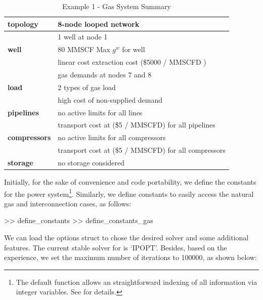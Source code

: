 \begin{table}[!ht]
\centering
\begin{threeparttable}
\caption{Example 1 - Gas System Summary}
\label{tab:ex1_gas}
\footnotesize
\begin{tabular}{ll}
\toprule
\bf{topology}	& 8-node looped network	 \\
\midrule
			& 1 well at node 1\\
\bf{well}		& 80 MMSCF Max $g^{w}$ for well\\
			& linear cost extraction cost (\$5000 / MMSCFD )\\
\midrule
			& gas demands at nodes 7 and 8\\
\bf{load}		& 2 types of gas load 	\\
			& high cost of non-supplied demand\\
\midrule
\bf{pipelines}	& no active limits for all lines	\\
			& transport cost at (\$5 / MMSCFD) for all pipelines \\
\midrule
\bf{compressors}	& no active limits for all compressors	\\
			& transport cost at (\$5 / MMSCFD) for all compressors \\
\midrule
\bf{storage}	& no storage considered	\\			
\bottomrule
\end{tabular}
\begin{tablenotes}
 \scriptsize
 \item [] {}
\end{tablenotes}
\end{threeparttable}
\end{table}

Initially, for the sake of convenience and code portability, we define the constants for the power system\footnote{The default \matpower{} function  allows an straightforward indexing of all information via integer variables. See \cite{matpower_manual} for details.}. Similarly, we define constants to easily access the natural gas and interconnection cases, as follows:

\begin{Code}
>> define_constants        %
>> define_constants_gas    %
\end{Code}

We can load the \matpower{} options struct to chose the desired solver and some additional features. The current stable solver for \mpng{}  is `IPOPT'. Besides, based on the experience, we set the maximum number of iterations to 100000, as shown below:

